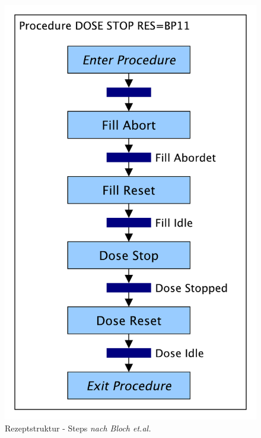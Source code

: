 \begin{figure}[h!]
\centering
\includegraphics[scale=0.29]{DA_files/Bilder/Anhang/Steps.pdf}
\caption[Rezeptstruktur modulare Anlage - Steps \textit{nach Bloch et.al.}]{Rezeptstruktur - Steps \textit{nach Bloch et.al.} \citep[53]{Bloch2017}}
\end{figure}

